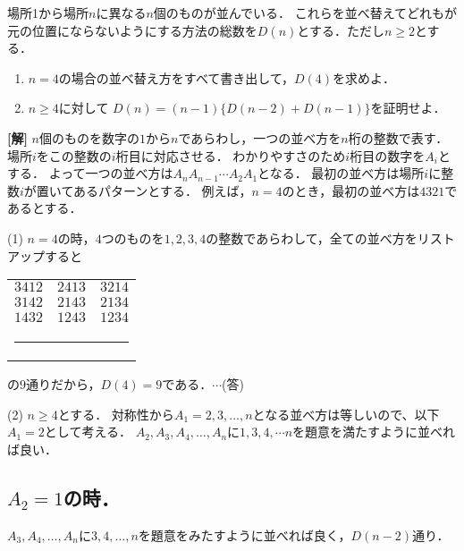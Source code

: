 \documentclass[a4paper,10pt]{ltjsarticle}
\begin{document}
\begin{oframed}
  場所1から場所$n$に異なる$n$個のものが並んでいる．
  これらを並べ替えてどれもが元の位置にならないようにする方法の総数を$D(n)$とする．ただし$n \ge 2$とする．

  \begin{enumerate}
    \item $n=4$の場合の並べ替え方をすべて書き出して，$D(4)$を求めよ．
    \item $n \ge 4$に対して $D(n)=(n-1)\{D(n-2)+D(n-1)\}$を証明せよ．
  \end{enumerate}
\end{oframed}
\setlength{\columnseprule}{0.4pt}
\begin{multicols}{2}
  {\bf[解]}
  $n$個のものを数字の$1$から$n$であらわし，一つの並べ方を$n$桁の整数で表す．
  場所$i$をこの整数の$i$桁目に対応させる．
  わかりやすさのため$i$桁目の数字を$A_i$とする．
  よって一つの並べ方は$A_nA_{n-1}\cdots A_{2}A_{1}$となる．
  最初の並べ方は場所$i$に整数$i$が置いてあるパターンとする．
  例えば，$n=4$のとき，最初の並べ方は$4321$であるとする．

  \vspace{10pt}
  (1)
  $n=4$の時，$4$つのものを$1,2,3,4$の整数であらわして，全ての並べ方をリストアップすると
  \begin{table}[H]
    \centering
    \begin{tabular}{ccc}
      $3412$ & $2413$ & $3214$                     \\
      $3142$ & $2143$ & $2134$                     \\
      $1432$ & $1243$ & $1234$                     \\
      \multicolumn{3}{c}{\rule[0.5ex]{3em}{0.4pt}} \\
    \end{tabular}
  \end{table}
  の$9$通りだから，$D(4)=9$である．$\cdots$(答)

  \vspace{10pt}
  (2)
  $n\ge 4$とする．
  対称性から$A_1=2,3,\dots,n$となる並べ方は等しいので、以下$A_1=2$として考える．
  $A_2,A_3, A_4, \dots, A_n$に$1,3,4,\cdots n$を題意を満たすように並べれば良い．

  \subsection{$A_2=1$の時．}

  $A_3, A_4, \dots, A_n$に$3,4,\dots,n$を題意をみたすように並べれば良く，$D(n-2)$通り．


\end{multicols}
\end{document}
